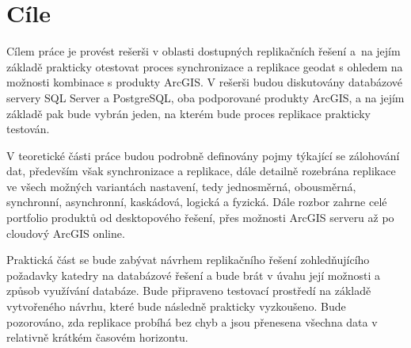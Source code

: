 \section{Cíle}
Cílem práce je provést rešerši v oblasti dostupných replikačních řešení a~na jejím základě prakticky otestovat proces synchronizace a replikace geodat s ohledem na možnosti kombinace s produkty ArcGIS. V rešerši budou diskutovány databázové servery SQL Server a PostgreSQL, oba podporované produkty ArcGIS, a na jejím základě pak bude vybrán jeden, na kterém bude proces replikace prakticky testován.

V teoretické části práce budou podrobně definovány pojmy týkající se zálohování dat, především však synchronizace a replikace, dále detailně rozebrána replikace ve všech možných variantách nastavení, tedy jednosměrná, obousměrná, synchronní, asynchronní, kaskádová, logická a fyzická. Dále rozbor zahrne celé portfolio produktů od desktopového řešení, přes možnosti ArcGIS serveru až po cloudový ArcGIS online.

Praktická část se bude zabývat návrhem replikačního řešení zohledňujícího požadavky katedry na databázové řešení a bude brát v úvahu její možnosti a způsob využívání databáze. Bude připraveno testovací prostředí na základě vytvořeného návrhu, které bude následně prakticky vyzkoušeno. Bude pozorováno, zda replikace probíhá bez chyb a jsou přenesena všechna data v relativně krátkém časovém horizontu. 


